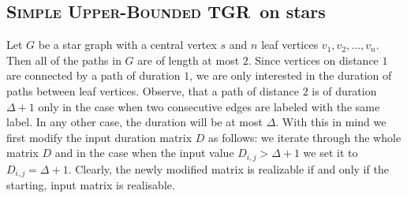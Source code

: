 \documentclass[a4paper,UKenglish,cleveref, autoref, thm-restate]{lipics-v2021}
\newcommand{\deltaUpperBound}{\textsc{Simple Upper-Bounded TGR}}
\begin{document}
\subsection{\deltaUpperBound\ on stars}

Let $G$ be a star graph with a central vertex $s$ and $n$ leaf vertices $v_1, v_2, \dots, v_n$. Then all of the paths in $G$ are of length at most $2$. Since vertices on distance $1$ are connected by a path of duration $1$, we are only interested in the duration of paths between leaf vertices.
Observe, that a path of distance $2$ is of duration $\Delta + 1$ only in the case when two consecutive edges are labeled with the same label. In any other case, the duration will be  at most $\Delta$.
With this in mind we first modify the input duration matrix $D$ as follows:
we iterate through the whole matrix $D$ and in the case when the input value $D_{i,j}  > \Delta + 1$ we set it to $D_{i,j} = \Delta + 1$. 
Clearly, the newly modified matrix is realizable if and only if the starting, input matrix is realisable.
\end{document}
